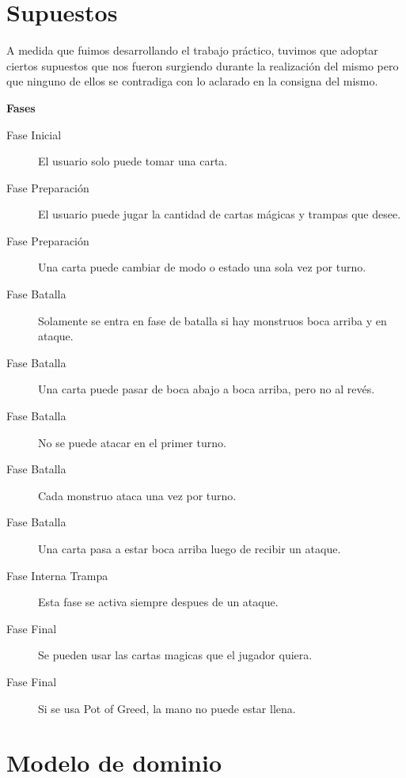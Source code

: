 \section{Supuestos}

A medida que fuimos desarrollando el trabajo práctico, tuvimos que adoptar ciertos supuestos que nos fueron surgiendo durante la realización del mismo pero que ninguno de ellos se contradiga con lo aclarado en la consigna del mismo.

\bigskip

{\large \raggedright \textbf{Fases}}

\begin{description}


\item[Fase Inicial] El usuario solo puede tomar una carta.

\item[Fase Preparación] El usuario puede jugar la cantidad de cartas mágicas y trampas que desee.

\item[Fase Preparación] Una carta puede cambiar de modo o estado una sola vez por turno.

\item[Fase Batalla] Solamente se entra en fase de batalla si hay monstruos boca arriba y en ataque.

\item[Fase Batalla] Una carta puede pasar de boca abajo a boca arriba, pero no al revés.

\item[Fase Batalla] No se puede atacar en el primer turno.

\item[Fase Batalla] Cada monstruo ataca una vez por turno.

\item[Fase Batalla] Una carta pasa a estar boca arriba luego de recibir un ataque.

\item[Fase Interna Trampa] Esta fase se activa siempre despues de un ataque.

\item[Fase Final] Se pueden usar las cartas magicas que el jugador quiera.

\item[Fase Final] Si se usa Pot of Greed, la mano no puede estar llena.

\end{description}

\section{Modelo de dominio}

